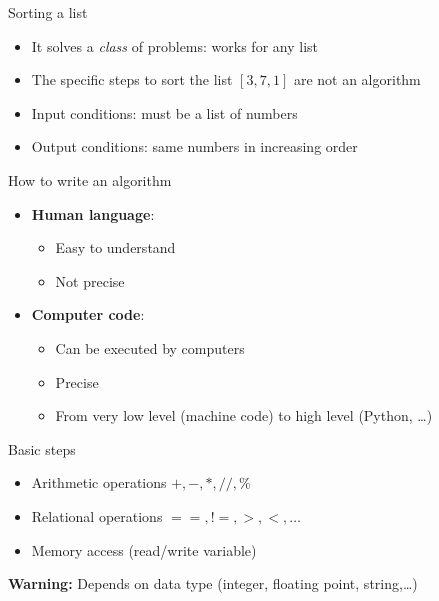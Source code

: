 \documentclass[11pt]{beamer}
\begin{document}
\begin{frame}{Sorting a list}
\begin{itemize}
	\item It solves a \emph{class} of problems: works for any list
  	\item The specific steps to sort the list $[3,7,1]$ are not an algorithm
	\item Input conditions: must be a list of numbers
	\item Output conditions: same numbers in increasing order
\end{itemize}
\end{frame}

\begin{frame}{How to write an algorithm}
	\begin{itemize}
		\item \textbf{Human language}:
			\begin{itemize}
				\item Easy to understand
				\item Not precise
			\end{itemize}

		\vspace{0.3cm}
		\item \textbf{Computer code}:
			\begin{itemize}
				\item Can be executed by computers
				\item Precise
				\item From very low level (machine code) to high level
		      (Python, \dots)
		    \end{itemize}
	\end{itemize}

\end{frame}

\begin{frame}{Basic steps}
	\begin{itemize}
				\item Arithmetic operations $+,-,*,//,\%$
				\item Relational operations $==, !=, >, <,\dots$
				\item Memory access (read/write variable)
	\end{itemize}

	\vspace{0.5cm}
	\textbf{Warning:}
		Depends on data type (integer, floating point, string,\dots)
\end{frame}
\end{document}
